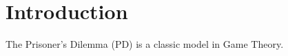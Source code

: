 
\chapter{Introduction}\label{cha:introduction}

The Prisoner's Dilemma (PD) is a classic model in Game Theory.